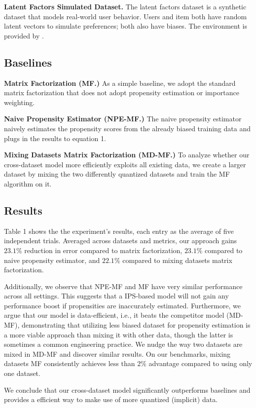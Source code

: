 \documentclass{article}
\begin{document}
\textbf{Latent Factors Simulated Dataset.}
The latent factors dataset is a synthetic dataset that models real-world user behavior. Users and item both have random latent vectors to simulate preferences; both also have biases. The environment is provided by \cite{krauth2020offline}.

\subsection{Baselines}
\textbf{Matrix Factorization (MF.)}
As a simple baseline, we adopt the standard matrix factorization that does not adopt propensity estimation or importance weighting.

\textbf{Naive Propensity Estimator (NPE-MF.)}
The naive propensity estimator naively estimates the propensity scores from the already biased training data and plugs in the results to equation 1.

\textbf{Mixing Datasets Matrix Factorization (MD-MF.)}
To analyze whether our cross-dataset model more efficiently exploits all existing data, we create a larger dataset by mixing the two differently quantized datasets and train the MF algorithm on it.

\subsection{Results}
Table 1 shows the the experiment's results, each entry as the average of five independent trials. Averaged across datasets and metrics, our approach gains $23.1\%$ reduction in error compared to matrix factorization, $23.1\%$ compared to naive propensity estimator, and $22.1\%$ compared to mixing datasets matrix factorization. 

Additionally, we observe that NPE-MF and MF have very similar performance across all settings. This suggests that a IPS-based model will not gain any performance boost if propensities are inaccurately estimated. Furthermore, we argue that our model is data-efficient, i.e., it beats the competitor model (MD-MF), demonstrating that utilizing less biased dataset for propensity estimation is a more viable approach than mixing it with other data, though the latter is sometimes a common engineering practice. We nudge the way two datasets are mixed in MD-MF and discover similar results. On our benchmarks, mixing datasets MF consistently achieves less than $2\%$ advantage compared to using only one dataset.

We conclude that our cross-dataset model significantly outperforms baselines and provides a efficient way to make use of more quantized (implicit) data. 
\end{document}
